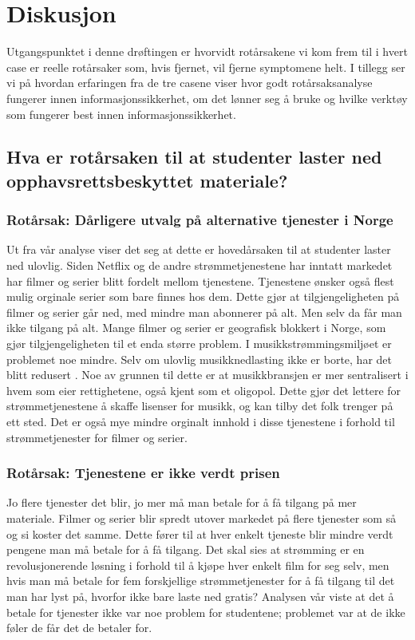\chapter{Diskusjon}
\label{kap:diskusjon}
Utgangspunktet i denne drøftingen er hvorvidt rotårsakene vi kom frem til i hvert case er reelle rotårsaker som, hvis fjernet, vil fjerne symptomene helt. I tillegg ser vi på hvordan erfaringen fra de tre casene viser hvor godt rotårsaksanalyse fungerer innen informasjonssikkerhet, om det lønner seg å bruke og hvilke verktøy som fungerer best innen informasjonssikkerhet. 

\section{Hva er rotårsaken til at studenter laster ned opphavsrettsbeskyttet materiale?}
\subsection*{Rotårsak: Dårligere utvalg på alternative tjenester i Norge}
Ut fra vår analyse viser det seg at dette er hovedårsaken til at studenter laster ned ulovlig. Siden Netflix og de andre strømmetjenestene har inntatt markedet har filmer og serier blitt fordelt mellom tjenestene. Tjenestene ønsker også flest mulig orginale serier som bare finnes hos dem. Dette gjør at tilgjengeligheten på filmer og serier går ned, med mindre man abonnerer på alt. Men selv da får man ikke tilgang på alt. Mange filmer og serier er geografisk blokkert i Norge, som gjør tilgjengeligheten til et enda større problem. I musikkstrømmingsmiljøet er problemet noe mindre. Selv om ulovlig musikknedlasting ikke er borte, har det blitt redusert \cite{musikkstream}. Noe av grunnen til dette er at musikkbransjen er mer sentralisert i hvem som eier rettighetene, også kjent som et oligopol. Dette gjør det lettere for strømmetjenestene å skaffe lisenser for musikk, og kan tilby det folk trenger på ett sted. Det er også mye mindre orginalt innhold i disse tjenestene i forhold til strømmetjenester for filmer og serier. 

\subsection*{Rotårsak: Tjenestene er ikke verdt prisen}
Jo flere tjenester det blir, jo mer må man betale for å få tilgang på mer materiale. Filmer og serier blir spredt utover markedet på flere tjenester som så og si koster det samme. Dette fører til at hver enkelt tjeneste blir mindre verdt pengene man må betale for å få tilgang. Det skal sies at strømming er en revolusjonerende løsning i forhold til å kjøpe hver enkelt film for seg selv, men hvis man må betale for fem forskjellige strømmetjenester for å få tilgang til det man har lyst på, hvorfor ikke bare laste ned gratis? Analysen vår viste at det å betale for tjenester ikke var noe problem for studentene; problemet var at de ikke føler de får det de betaler for. 

